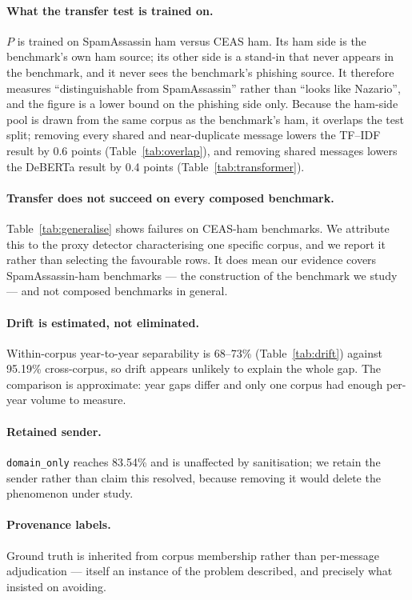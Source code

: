 \documentclass[twoside,11pt]{article}
\begin{document}
\paragraph{What the transfer test is trained on.} $P$ is trained on
SpamAssassin ham versus CEAS ham. Its ham side is the benchmark's own ham
source; its other side is a stand-in that never appears in the benchmark, and
it never sees the benchmark's phishing source. It therefore measures
``distinguishable from SpamAssassin'' rather than ``looks like Nazario'', and
the figure is a lower bound on the phishing side only. Because the ham-side
pool is drawn from the same corpus as the benchmark's ham, it overlaps the
test split; removing every shared and near-duplicate message lowers the
TF--IDF result by 0.6 points (Table~\ref{tab:overlap}), and removing shared
messages lowers the DeBERTa result by 0.4 points
(Table~\ref{tab:transformer}).

\paragraph{Transfer does not succeed on every composed benchmark.}
Table~\ref{tab:generalise} shows failures on CEAS-ham benchmarks. We attribute
this to the proxy detector characterising one specific corpus, and we report
it rather than selecting the favourable rows. It does mean our evidence
covers SpamAssassin-ham benchmarks --- the construction of the benchmark we
study --- and not
composed benchmarks in general.

\paragraph{Drift is estimated, not eliminated.} Within-corpus year-to-year
separability is 68--73\% (Table~\ref{tab:drift}) against 95.19\%
cross-corpus, so drift appears unlikely to explain the whole gap. The comparison is approximate:
year gaps differ and only one corpus had enough per-year volume to measure.

\paragraph{Retained sender.} \texttt{domain\_only} reaches 83.54\% and is
unaffected by sanitisation; we retain the sender rather than claim this
resolved, because removing it would delete the phenomenon under study.

\paragraph{Provenance labels.} Ground truth is inherited from corpus
membership rather than per-message adjudication --- itself an instance of the
problem described, and precisely what \citet{cormack2005} insisted on avoiding.
\end{document}

